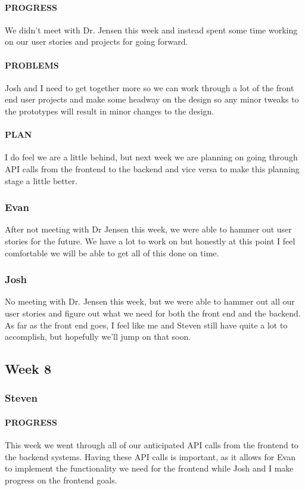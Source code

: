 \documentclass[onecolumn, draftclsnofoot,10pt, compsoc]{IEEEtran}
\begin{document}
	\paragraph{PROGRESS}
	We didn't meet with Dr. Jensen this week and instead spent some time working on our user stories and projects for going forward. 
	
	\paragraph{PROBLEMS}
	Josh and I need to get together more so we can work through a lot of the front end user projects and make some headway on the design so any minor tweaks to the prototypes will result in minor changes to the design.
	
	\paragraph{PLAN}
	I do feel we are a little behind, but next week we are planning on going through API calls from the frontend to the backend and vice versa to make this planning stage a little better.
	
	\subsubsection{Evan}
	
	After not meeting with Dr Jensen this week, we were able to hammer out user stories for the future. We have a lot to work on but honestly at this point I feel comfortable we will be able to get all of this done on time.
	
	\subsubsection{Josh}
	No meeting with Dr. Jensen this week, but we were able to hammer out all our user stories and figure out what we need for both the front end and the backend. As far as the front end goes, I feel like me and Steven still have quite a lot to accomplish, but hopefully we'll jump on that soon.
\subsection{Week 8}
	\subsubsection{Steven}
	
	\paragraph{PROGRESS}
	This week we went through all of our anticipated API calls from the frontend to the backend systems. Having these API calls is important, as it allows for Evan to implement the functionality we need for the frontend while Josh and I make progress on the frontend goals. 
	
\end{document}
